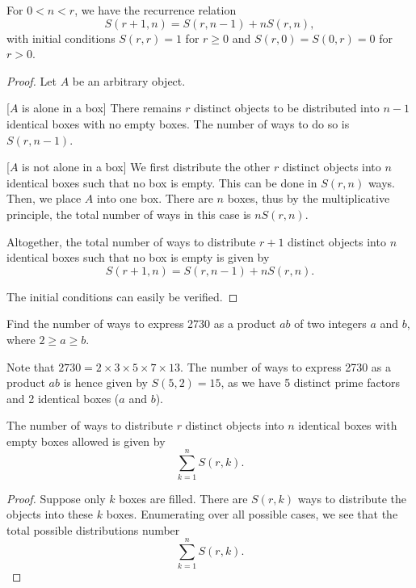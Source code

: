 \begin{proposition}
    For $0 < n < r$, we have the recurrence relation \[S(r+1, n) = S(r,n-1) + nS(r,n),\] with initial conditions $S(r, r) = 1$ for $r \geq 0$ and $S(r, 0) = S(0, r) = 0$ for $r > 0$.
\end{proposition}
\begin{proof}
    Let $A$ be an arbitrary object.

    [$A$ is alone in a box] There remains $r$ distinct objects to be distributed into $n-1$ identical boxes with no empty boxes. The number of ways to do so is $S(r, n-1)$.

    [$A$ is not alone in a box] We first distribute the other $r$ distinct objects into $n$ identical boxes such that no box is empty. This can be done in $S(r, n)$ ways. Then, we place $A$ into one box. There are $n$ boxes, thus by the multiplicative principle, the total number of ways in this case is $n S(r,n)$.

    Altogether, the total number of ways to distribute $r+1$ distinct objects into $n$ identical boxes such that no box is empty is given by \[S(r+1, n) = S(r, n-1) + nS(r,n).\]

    The initial conditions can easily be verified.
\end{proof}

\begin{sample}
    Find the number of ways to express 2730 as a product $ab$ of two integers $a$ and $b$, where $2 \geq a \geq b$.
\end{sample}
\begin{sampans}
    Note that $2730 = 2 \times 3 \times 5 \times 7 \times 13$. The number of ways to express 2730 as a product $ab$ is hence given by $S(5,2) = 15$, as we have 5 distinct prime factors and 2 identical boxes ($a$ and $b$).
\end{sampans}

\begin{proposition}
    The number of ways to distribute $r$ distinct objects into $n$ identical boxes with empty boxes allowed is given by \[\sum_{k = 1}^n S(r,k).\]
\end{proposition}
\begin{proof}
    Suppose only $k$ boxes are filled. There are $S(r,k)$ ways to distribute the objects into these $k$ boxes. Enumerating over all possible cases, we see that the total possible distributions number \[\sum_{k = 1}^n S(r, k).\]
\end{proof}

